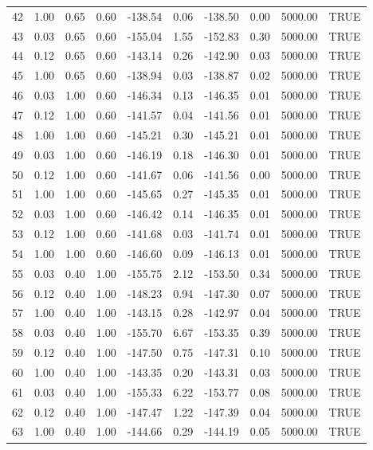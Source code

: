 \begin{table}[ht]
\begin{tabular}{rrrrrrrrrl}
  42 & 1.00 & 0.65 & 0.60 & -138.54 & 0.06 & -138.50 & 0.00 & 5000.00 & TRUE \\ 
  43 & 0.03 & 0.65 & 0.60 & -155.04 & 1.55 & -152.83 & 0.30 & 5000.00 & TRUE \\ 
  44 & 0.12 & 0.65 & 0.60 & -143.14 & 0.26 & -142.90 & 0.03 & 5000.00 & TRUE \\ 
  45 & 1.00 & 0.65 & 0.60 & -138.94 & 0.03 & -138.87 & 0.02 & 5000.00 & TRUE \\ 
  46 & 0.03 & 1.00 & 0.60 & -146.34 & 0.13 & -146.35 & 0.01 & 5000.00 & TRUE \\ 
  47 & 0.12 & 1.00 & 0.60 & -141.57 & 0.04 & -141.56 & 0.01 & 5000.00 & TRUE \\ 
  48 & 1.00 & 1.00 & 0.60 & -145.21 & 0.30 & -145.21 & 0.01 & 5000.00 & TRUE \\ 
  49 & 0.03 & 1.00 & 0.60 & -146.19 & 0.18 & -146.30 & 0.01 & 5000.00 & TRUE \\ 
  50 & 0.12 & 1.00 & 0.60 & -141.67 & 0.06 & -141.56 & 0.00 & 5000.00 & TRUE \\ 
  51 & 1.00 & 1.00 & 0.60 & -145.65 & 0.27 & -145.35 & 0.01 & 5000.00 & TRUE \\ 
  52 & 0.03 & 1.00 & 0.60 & -146.42 & 0.14 & -146.35 & 0.01 & 5000.00 & TRUE \\ 
  53 & 0.12 & 1.00 & 0.60 & -141.68 & 0.03 & -141.74 & 0.01 & 5000.00 & TRUE \\ 
  54 & 1.00 & 1.00 & 0.60 & -146.60 & 0.09 & -146.13 & 0.01 & 5000.00 & TRUE \\ 
  55 & 0.03 & 0.40 & 1.00 & -155.75 & 2.12 & -153.50 & 0.34 & 5000.00 & TRUE \\ 
  56 & 0.12 & 0.40 & 1.00 & -148.23 & 0.94 & -147.30 & 0.07 & 5000.00 & TRUE \\ 
  57 & 1.00 & 0.40 & 1.00 & -143.15 & 0.28 & -142.97 & 0.04 & 5000.00 & TRUE \\ 
  58 & 0.03 & 0.40 & 1.00 & -155.70 & 6.67 & -153.35 & 0.39 & 5000.00 & TRUE \\ 
  59 & 0.12 & 0.40 & 1.00 & -147.50 & 0.75 & -147.31 & 0.10 & 5000.00 & TRUE \\ 
  60 & 1.00 & 0.40 & 1.00 & -143.35 & 0.20 & -143.31 & 0.03 & 5000.00 & TRUE \\ 
  61 & 0.03 & 0.40 & 1.00 & -155.33 & 6.22 & -153.77 & 0.08 & 5000.00 & TRUE \\ 
  62 & 0.12 & 0.40 & 1.00 & -147.47 & 1.22 & -147.39 & 0.04 & 5000.00 & TRUE \\ 
  63 & 1.00 & 0.40 & 1.00 & -144.66 & 0.29 & -144.19 & 0.05 & 5000.00 & TRUE \\ 

\end{tabular}
\end{table}
